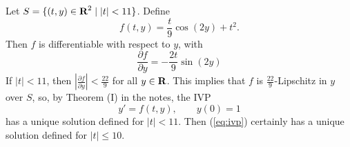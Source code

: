 \documentclass{homework}
\begin{document}
	\maketitle
	
	\question Let $S = \{(t,y) \in \textbf{R}^2 \mid |t| < 11\}$. Define
	\begin{equation}
		f(t,y) = \frac{t}{9}\cos(2y) + t^2.
	\end{equation}
	Then $f$ is differentiable with respect to $y$, with
	\begin{equation}
		\frac{\partial f}{\partial y} = -\frac{2t}{9}\sin(2y)
	\end{equation}
	If $|t| < 11$, then $\left|\frac{\partial f}{\partial y}\right| <\frac{22}{9}$ for all $y \in \textbf{R}$. This implies that $f$ is $\frac{22}{9}$-Lipschitz in $y$ over $S$, so, by Theorem (I) in the notes, the IVP
	\begin{equation}
		\label{eq:ivp}
		y' = f(t,y), \qquad y(0) = 1
	\end{equation}
	has a unique solution defined for $|t| < 11$. Then (\ref{eq:ivp}) certainly has a unique solution defined for $|t| \le 10$.
	
\end{document}

